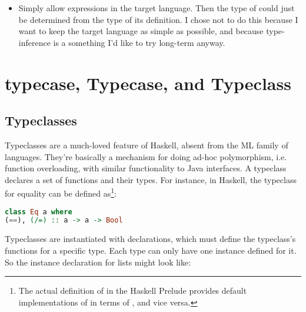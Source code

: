 \documentclass[pageno]{jpaper}
\begin{document}
{{{\begin{itemize}
\begin{lstlisting}
  (\ f => f 73 5)
    (\ (x:int) (\ (y:int) => x + y))
\end{lstlisting}

the type inference algorithm would figure out that  must have type  because
 has type .
\item Simply allow  expressions in the target language.  Then the type of  could
just be determined from the type of its definition. I chose not to do this because I want to keep the
target language as simple as possible, and because type-inference is a something I'd like to try long-term
anyway.

\end{itemize}

\section{typecase, Typecase, and Typeclass}

\subsection{Typeclasses}
Typeclasses are a much-loved feature of Haskell, absent from the ML family of languages. They're basically
a mechanism for doing ad-hoc polymorphism, i.e. function overloading, with similar functionality to
Java interfaces. A typeclass declares a set of functions and their types.
For instance, in Haskell, the  typeclass for equality can be defined as\footnote{The actual
definition of  in the Haskell Prelude provides default implementations of \lstiH{/=} in terms of \lstiH{==}, and vice versa.}:

\begin{lstlisting}[language=Haskell]
class Eq a where
(==), (/=) :: a -> a -> Bool
\end{lstlisting}

Typeclasses are instantiated with  declarations, which must define the typeclass's functions for a specific type.  Each type can only have one instance defined for it. So the
instance declaration for lists might look like:

}}}
\end{document}
